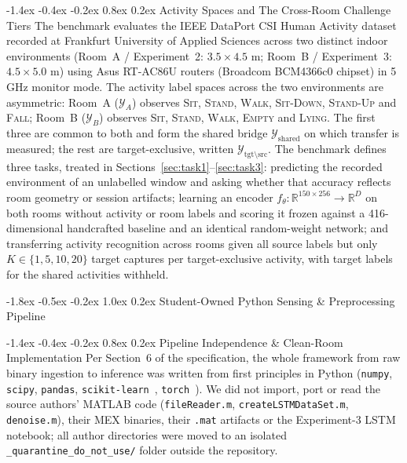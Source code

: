 \documentclass[10pt,a4paper]{article}
\makeatletter
\renewcommand{\section}{\@startsection{section}{1}{\z@}%
  {-1.8ex \@plus -0.5ex \@minus -0.2ex}%
  {1.0ex \@plus 0.2ex}%
  {\normalfont\large\bfseries\color{primary}}}
\renewcommand{\subsection}{\@startsection{subsection}{2}{\z@}%
  {-1.4ex \@plus -0.4ex \@minus -0.2ex}%
  {0.8ex \@plus 0.2ex}%
  {\normalfont\normalsize\bfseries\color{secondary}}}
\makeatother
\begin{document}
\subsection{Activity Spaces and The Cross-Room Challenge Tiers}
The benchmark evaluates the IEEE DataPort CSI Human Activity dataset~\cite{csi_dataset,schafer2021human} recorded at Frankfurt University of Applied Sciences across two distinct indoor environments (Room~A / Experiment~2: $3.5 \times 4.5\text{ m}$; Room~B / Experiment~3: $4.5 \times 5.0\text{ m}$) using Asus RT-AC86U routers (Broadcom BCM4366c0 chipset) in 5 GHz monitor mode. The activity label spaces across the two environments are asymmetric:
Room~A ($\mathcal{Y}_A$) observes \textsc{Sit}, \textsc{Stand}, \textsc{Walk}, \textsc{Sit-Down}, \textsc{Stand-Up} and \textsc{Fall}; Room~B ($\mathcal{Y}_B$) observes \textsc{Sit}, \textsc{Stand}, \textsc{Walk}, \textsc{Empty} and \textsc{Lying}. The first three are common to both and form the shared bridge $\mathcal{Y}_{\text{shared}}$ on which transfer is measured; the rest are target-exclusive, written $\mathcal{Y}_{\text{tgt} \setminus \text{src}}$.
The benchmark defines three tasks, treated in Sections~\ref{sec:task1}--\ref{sec:task3}: predicting the recorded environment of an unlabelled window and asking whether that accuracy reflects room geometry or session artifacts; learning an encoder $f_\theta: \mathbb{R}^{150 \times 256} \to \mathbb{R}^{D}$ on both rooms without activity or room labels and scoring it frozen against a 416-dimensional handcrafted baseline and an identical random-weight network; and transferring activity recognition across rooms given all source labels but only $K \in \{1,5,10,20\}$ target captures per target-exclusive activity, with target labels for the shared activities withheld.

\section{Student-Owned Python Sensing \& Preprocessing Pipeline}

\subsection{Pipeline Independence \& Clean-Room Implementation}
Per Section~6 of the specification, the whole framework from raw binary ingestion to inference was written from first principles in Python (\texttt{numpy}, \texttt{scipy}, \texttt{pandas}, \texttt{scikit-learn}~\cite{pedregosa2011scikit}, \texttt{torch}~\cite{paszke2019pytorch}). We did not import, port or read the source authors' MATLAB code (\texttt{fileReader.m}, \texttt{createLSTMDataSet.m}, \texttt{denoise.m}), their MEX binaries, their \texttt{.mat} artifacts or the Experiment-3 LSTM notebook; all author directories were moved to an isolated \texttt{\_quarantine\_do\_not\_use/} folder outside the repository.
\end{document}
